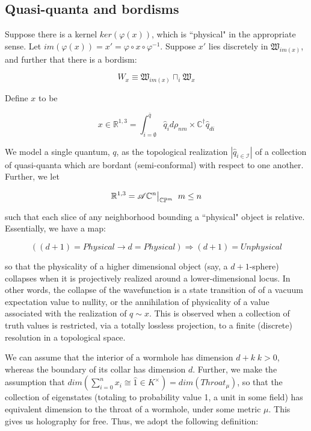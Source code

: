 \documentclass{article}
\newcommand\restr[2]{{%
		\left.\kern-\nulldelimiterspace %
		#1 %
		\littletaller %
		\right|_{#2} %
}}
\newcommand{\littletaller}{\mathchoice{\vphantom{\big|}}{}{}{}}
\begin{document}
	\subsection{Quasi-quanta and bordisms}
	
	Suppose there is a kernel $ker(\varphi(x))$, which is ``physical" in the appropriate sense. Let $im(\varphi(x)) = x' = \varphi \circ x \circ \varphi^{-1}$. Suppose $x'$ lies discretely in $\mathfrak{W}_{im(x)}$, and further that there is a bordism:
	
	$$W_x \equiv \mathfrak{W}_{im(x)} \sqcap_i \mathfrak{W}_x$$
	
	Define $x$ to be 
	
	$$x \in \mathbb{R}^{1,3} = \int_{i=\emptyset}^{\bar{q}} \hat{q}_i d\rho_{nm} \times \mathbb{C}^\dagger \hat{q}_{di}$$
	
	We model a single quantum, $q$, as the topological realization $|\hat{q}_{i \in \mathcal{I}}|$ of a collection of quasi-quanta which are bordant (semi-conformal) with respect to one another. Further, we let
	
	$$\mathbb{R}^{1,3} = \restr{\mathscr{A} \mathbb{C}^n}{\mathbb{C}\mathbb{P}^m} \; \; m \leq n$$
	
	such that each slice of any neighborhood bounding a ``physical" object is relative. Essentially, we have a map:
	
	$$((d+1) = Physical \longrightarrow d = Physical) \Rightarrow (d+1) = Unphysical$$
	
	so that the physicality of a higher dimensional object (say, a $d+1$-sphere) collapses when it is projectively realized around a lower-dimensional locus. In other words, the collapse of the wavefunction is a state transition of of a vacuum expectation value to nullity, or the annihilation of physicality of a value associated with the realization of $q \sim x$. This is observed when a collection of truth values is restricted, via a totally lossless projection, to a finite (discrete) resolution in a topological space.
	
	We can assume that the interior of a wormhole has dimension $d+k \; k>0$, whereas the boundary of its collar has dimension $d$. Further, we make the assumption that $dim(\sum_{i=0}^{n} x_i \cong \hat{1} \in K^\times) = dim(Throat_\mu)$, so that the collection of eigenstates (totaling to probability value 1, a unit in some field) has equivalent dimension to the throat of a wormhole, under some metric $\mu$. This gives us holography for free. Thus, we adopt the following definition:
	
\end{document}
